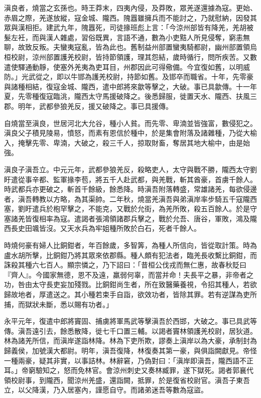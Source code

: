 \begin{pinyinscope}
滇良者，燒當之玄孫也。時王莽末，四夷內侵，及莽敗，眾羌遂還據為寇。更始、赤眉之際，羌遂放縱，寇金城、隴西。隗囂雖擁兵而不能討之，乃就慰納，因發其眾與漢相拒。建武九年，隗囂死，司徒掾班彪上言：「今涼州部皆有降羌，羌胡被髮左衽，而與漢人雜處，習俗既異，言語不通，數為小吏黠人所見侵奪，窮恚無聊，故致反叛。夫蠻夷寇亂，皆為此也。舊制益州部置蠻夷騎都尉，幽州部置領烏桓校尉，涼州部置護羌校尉，皆持節領護，理其怨結，歲時循行，問所疾苦。又數遣使驛通動靜，使塞外羌夷為吏耳目，州郡因此可得儆備。今宜復如舊，以明威防。」光武從之，即以牛邯為護羌校尉，持節如舊。及邯卒而職省。十年，先零豪與諸種相結，復寇金城、隴西，遣中郎將來歙等擊之，大破。事已具歙傳。十一年夏，先零種復寇臨洮，隴西太守馬援破降之。後悉歸服，徙置天水、隴西、扶風三郡。明年，武都參狼羌反，援又破降之。事已具援傳。

自燒當至滇良，世居河北大允谷，種小人貧。而先零、卑湳並皆強富，數侵犯之。滇良父子積見陵易，憤怒，而素有恩信於種中，於是集會附落及諸雜種，乃從大榆入，掩擊先零、卑湳，大破之，殺三千人，掠取財畜，奪居其地大榆中，由是始強。

滇良子滇吾立。中元元年，武都參狼羌反，殺略吏人，太守與戰不勝，隴西太守劉盱遣從事辛都、監軍掾李苞，將五千人赴武都，與羌戰，斬其酋豪，首虜千餘人。時武都兵亦更破之，斬首千餘級，餘悉降。時滇吾附落轉盛，常雄諸羌，每欲侵邊者，滇吾轉教以方略，為其渠帥。二年秋，燒當羌滇吾與弟滇岸率步騎五千寇隴西塞，劉盱遣兵於枹罕擊之，不能克，又戰於允街，為羌所敗，殺五百餘人。於是守塞諸羌皆復相率為寇。遣謁者張鴻領諸郡兵擊之，戰於允吾、唐谷，軍敗，鴻及隴西長史田颯皆沒。又天水兵為牢姐種所敗於白石，死者千餘人。

時燒何豪有婦人比銅鉗者，年百餘歲，多智筭，為種人所信向，皆從取計策。時為盧水胡所擊，比銅鉗乃將其眾來依郡縣。種人頗有犯法者，臨羌長收繫比銅鉗，而誅殺其種六七百人。顯宗憐之，乃下詔曰：「昔桓公伐戎而無仁惠，故春秋貶曰『齊人』。今國家無德，恩不及遠，羸弱何辜，而當并命！夫長平之暴，非帝者之功，咎由太守長吏妄加殘戮。比銅鉗尚生者，所在致醫藥養視，令招其種人，若欲歸故地者，厚遣送之。其小種若束手自詣，欲效功者，皆除其罪。若有逆謀為吏所捕，而獄狀未斷，悉以賜有功者。」

永平元年，復遣中郎將竇固、捕虜將軍馬武等擊滇吾於西邯，大破之。事已具武等傳。滇吾遠引去，餘悉散降，徙七千口置三輔。以謁者竇林領護羌校尉，居狄道。林為諸羌所信，而滇岸遂詣林降。林為下吏所欺，謬奏上滇岸以為大豪，承制封為歸義侯，加號漢大都尉。明年，滇吾復降，林復奏其第一豪，與俱詣闕獻見。帝怪一種兩豪，疑其非實，以事詰林。林辭窘，乃偽對曰：「滇岸即滇吾，隴西語不正耳。」帝窮驗知之，怒而免林官。會涼州刺史又奏林臧罪，遂下獄死。謁者郭襄代領校尉事，到隴西，聞涼州羌盛，還詣闕，抵罪，於是復省校尉官。滇吾子東吾立，以父降漢，乃入居塞內，謹愿自守。而諸弟迷吾等數為寇盜。


\end{pinyinscope}
